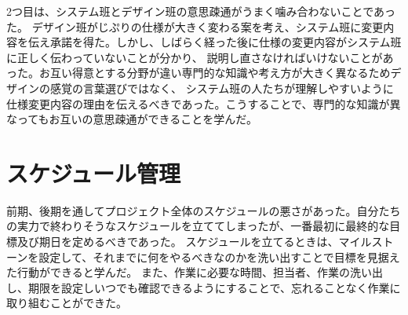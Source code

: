 2つ目は、システム班とデザイン班の意思疎通がうまく噛み合わないことであった。
デザイン班がじぷりの仕様が大きく変わる案を考え、システム班に変更内容を伝え承諾を得た。しかし、しばらく経った後に仕様の変更内容がシステム班に正しく伝わっていないことが分かり、
説明し直さなければいけないことがあった。お互い得意とする分野が違い専門的な知識や考え方が大きく異なるためデザインの感覚の言葉選びではなく、
システム班の人たちが理解しやすいように仕様変更内容の理由を伝えるべきであった。こうすることで、専門的な知識が異なってもお互いの意思疎通ができることを学んだ。

\section{スケジュール管理}
前期、後期を通してプロジェクト全体のスケジュールの悪さがあった。自分たちの実力で終わりそうなスケジュールを立ててしまったが、一番最初に最終的な目標及び期日を定めるべきであった。
スケジュールを立てるときは、マイルストーンを設定して、それまでに何をやるべきなのかを洗い出すことで目標を見据えた行動ができると学んだ。
また、作業に必要な時間、担当者、作業の洗い出し、期限を設定しいつでも確認できるようにすることで、忘れることなく作業に取り組むことができた。
